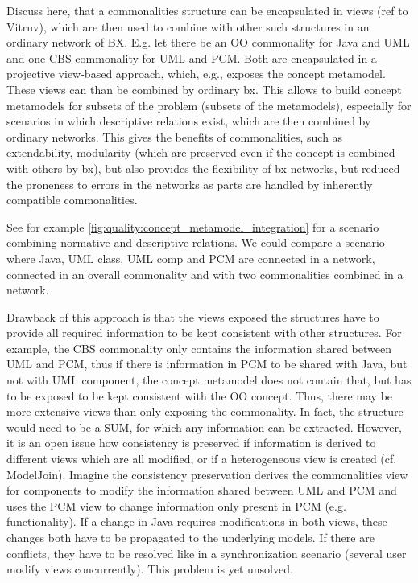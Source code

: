 
Discuss here, that a commonalities structure can be encapsulated in views (ref to Vitruv), which are then used to combine with other such structures in an ordinary network of BX. E.g. let there be an OO commonality for Java and UML and one CBS commonality for UML and PCM. Both are encapsulated in a projective view-based approach, which, e.g., exposes the concept metamodel. These views can than be combined by ordinary bx. This allows to build concept metamodels for subsets of the problem (subsets of the metamodels), especially for scenarios in which descriptive relations exist, which are then combined by ordinary networks. This gives the benefits of commonalities, such as extendability, modularity (which are preserved even if the concept is combined with others by bx), but also provides the flexibility of bx networks, but reduced the proneness to errors in the networks as parts are handled by inherently compatible commonalities.

See for example \autoref{fig:quality:concept_metamodel_integration} for a scenario combining normative and descriptive relations. We could compare a scenario where Java, UML class, UML comp and PCM are connected in a network, connected in an overall commonality and with two commonalities combined in a network.

Drawback of this approach is that the views exposed the structures have to provide all required information to be kept consistent with other structures. For example, the CBS commonality only contains the information shared between UML and PCM, thus if there is information in PCM to be shared with Java, but not with UML component, the concept metamodel does not contain that, but has to be exposed to be kept consistent with the OO concept. Thus, there may be more extensive views than only exposing the commonality. In fact, the structure would need to be a SUM, for which any information can be extracted. However, it is an open issue how consistency is preserved if information is derived to different views which are all modified, or if a heterogeneous view is created (cf. ModelJoin). Imagine the consistency preservation derives the commonalities view for components to modify the information shared between UML and PCM and uses the PCM view to change information only present in PCM (e.g. functionality). If a change in Java requires modifications in both views, these changes both have to be propagated to the underlying models. If there are conflicts, they have to be resolved like in a synchronization scenario (several user modify views concurrently). This problem is yet unsolved.
